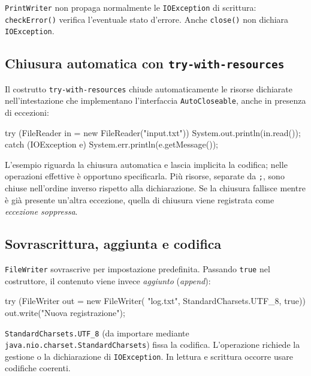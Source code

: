 \begin{warning}
\texttt{PrintWriter} non propaga normalmente le
\texttt{IOException} di scrittura: \texttt{checkError()} verifica
l'eventuale stato d'errore. Anche \texttt{close()} non dichiara
\texttt{IOException}.
\end{warning}

\subsection{Chiusura automatica con \texttt{try-with-resources}}
\label{sec:fi-java-file-try-resources}

Il costrutto \texttt{try-with-resources} chiude automaticamente
le risorse dichiarate nell'intestazione che implementano
l'interfaccia \texttt{AutoCloseable}, anche in presenza di eccezioni:

\begin{unipdcode}[language=Java]
try (FileReader in = new FileReader("input.txt")) {
    System.out.println(in.read());
} catch (IOException e) {
    System.err.println(e.getMessage());
}
\end{unipdcode}

L'esempio riguarda la chiusura automatica e lascia implicita la
codifica; nelle operazioni effettive è opportuno specificarla.
Più risorse, separate da \texttt{;}, sono chiuse nell'ordine
inverso rispetto alla dichiarazione. Se la chiusura fallisce
mentre è già presente un'altra eccezione, quella di chiusura
viene registrata come \emph{eccezione soppressa}.

\subsection{Sovrascrittura, aggiunta e codifica}
\label{sec:fi-java-file-append}

\texttt{FileWriter} sovrascrive per impostazione predefinita.
Passando \texttt{true} nel costruttore, il contenuto viene invece
\emph{aggiunto} (\emph{append}):

\begin{unipdcode}[language=Java]
try (FileWriter out = new FileWriter(
        "log.txt", StandardCharsets.UTF_8, true)) {
    out.write("Nuova registrazione\n");
}
\end{unipdcode}

\texttt{StandardCharsets.UTF\_8} (da importare mediante
\texttt{java.nio.charset.StandardCharsets}) fissa la codifica.
L'operazione richiede la gestione o la dichiarazione di
\texttt{IOException}. In lettura e scrittura occorre usare
codifiche coerenti.

